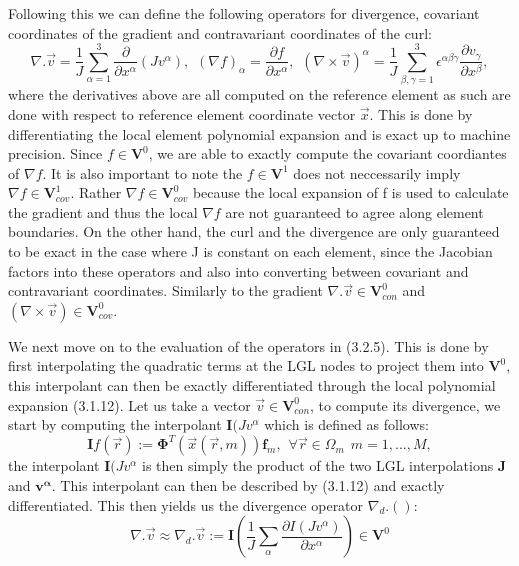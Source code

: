 \documentclass{report}
\numberwithin{equation}{section}
\begin{document}
Following this we can define the following operators for divergence, covariant coordinates of the gradient and contravariant coordinates of the curl:
\begin{equation}
    \nabla . \overrightarrow{v} = \frac{1}{J}\sum_{\alpha=1}^3 \frac{\partial}{\partial x^{\alpha}}(Jv^{\alpha}), \hspace{5pt} (\nabla f)_{\alpha} = \frac{\partial f }{\partial x^{\alpha}}, \hspace{5pt} (\nabla \times \overrightarrow{v})^{\alpha} = \frac{1}{J} \sum_{\beta,\gamma=1}^3 \epsilon^{\alpha \beta \gamma}\frac{\partial v_{\gamma}}{\partial x^{\beta}},
\end{equation}
where the derivatives above are all computed on the reference element as such are done with respect to reference element coordinate vector $\overrightarrow{x}$. This is done by differentiating the local element polynomial expansion and is exact up to machine precision. Since $f \in \mathbf{V}^0 $, we are able to exactly compute the covariant coordiantes of $\nabla f$. It is also important to note the $f \in \mathbf{V}^1$ does not neccessarily imply $\nabla f \in \mathbf{V}_{cov}^1$. Rather $\nabla f \in \mathbf{V}_{cov}^0$ because the local expansion of f is used to calculate the gradient and thus the local $\nabla f$ are not guaranteed to agree along element boundaries. On the other hand, the curl and the divergence are only guaranteed to be exact in the case where J is constant on each element, since the Jacobian factors into these operators and also into converting between covariant and contravariant coordinates. Similarly to the gradient $\nabla . \overrightarrow{v} \in \mathbf{V}_{con}^0$ and $(\nabla \times \overrightarrow{v}) \in \mathbf{V}_{cov}^0$.

We next move on to the evaluation of the operators in (3.2.5). This is done by first interpolating the quadratic terms at the LGL nodes to project them into $\mathbf{V}^0$, this interpolant can then be exactly differentiated through the local polynomial expansion (3.1.12). Let us take  a vector $\overrightarrow{v} \in \mathbf{V}_{con}^0$, to compute its divergence, we start by computing the interpolant $\mathbf{I}(Jv^{\alpha}$ which is defined as follows:
\begin{equation}
    \mathbf{I}f(\overrightarrow{r}):=\boldsymbol{\Phi}^T(\overrightarrow{x}(\overrightarrow{r},m))\mathbf{f}_m, \hspace{5pt} \forall \overrightarrow{r} \in \Omega_m \hspace{5pt} m=1,...,M,
\end{equation}
the interpolant $\mathbf{I}(Jv^{\alpha}$ is then simply the product of the two LGL interpolations $\mathbf{J}$ and $\mathbf{v^{\alpha}}$. This interpolant can then be described by (3.1.12) and exactly differentiated. This then yields us the divergence operator $\nabla_d .()$:
\begin{equation}
    \nabla . \overrightarrow{v} \approx \nabla_d . \overrightarrow{v} :=\mathbf{I}(\frac{1}{J}\sum_{\alpha} \frac{\partial I(Jv^{\alpha})}{\partial x^{\alpha}}) \in \mathbf{V}^0
\end{equation}
\end{document}
